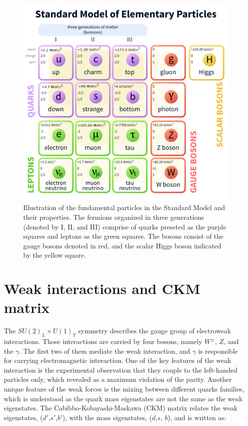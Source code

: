 \begin{figure}
\centering
\includegraphics[scale=0.5]{figures/SM.png}
\caption{Illustration of the fundamental particles in the Standard Model and their properties. The fermions organized in three generations (denoted by I, II, and III) comprise of quarks preseted as the purple squares and leptons as the green squares. The bosons consist of the gauge bosons denoted in red, and the scalar Higgs boson indicated by the yellow square. 
\label{fig:SM}}
\end{figure}

\section{Weak interactions and CKM matrix}

The $ SU(2)_L \times U(1)_Y$ symmetry describes the gauge group of electroweak interactions. Those interactions are carried by four bosons, namely $W^{\pm}$, $Z$, and the $\gamma$.  The first two of them mediate the weak interaction, and $\gamma$ is responsible for carrying electromagnetic interaction. One of the key features of the weak interaction is the experimental observation that they couple to the left-handed particles only, which revealed as a maximum violation of the parity. Another unique feature of the weak forces is the mixing between different quarks families, which is understood as the quark mass eigenstates are not the same as the weak eigenstates. The Cabibbo-Kobayashi-Maskawa (CKM) matrix relates the weak eigenstates,  ($d\prime$,$s\prime$,$b\prime$), with the mass eigenstates, ($d$,$s$, $b$), and is written as:

